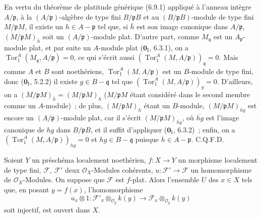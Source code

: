En vertu du théorème de platitude générique (6.9.1) appliqué à l'anneau
intègre $A/\mathfrak p$, à la $(A/\mathfrak p)$-algèbre de type fini
$B/\mathfrak pB$ et au $(B/\mathfrak pB)$-module de type fini
$M/\mathfrak pM$, il existe un $h\in A-\mathfrak p$ tel que, si $\bar h$ est
son image canonique dans $A/\mathfrak p$,
$(M/\mathfrak pM)_{\bar h}$ soit un $(A/\mathfrak p)$-module plat. D'autre
part, comme $M_{\mathfrak q}$ est un $A_{\mathfrak p}$-module plat, et par
suite un $A$-module plat ($\mathbf 0_{\mathrm I}$, 6.3.1), on a
$\operatorname{Tor}_1^A(M_{\mathfrak q},A/\mathfrak p)=0$, ce qui s'écrit
aussi
$(\operatorname{Tor}_1^A(M,A/\mathfrak p))_{\mathfrak q}=0$. Mais comme $A$
et $B$ sont noethériens, $\operatorname{Tor}_1^A(M,A/\mathfrak p)$ est un
$B$-module de type fini, donc ($\mathbf 0_{\mathrm I}$, 5.2.2) il existe
$g\in B-\mathfrak q$ tel que
$(\operatorname{Tor}_1^A(M,A/\mathfrak p))_g=0$. D'ailleurs, on a
$(M/\mathfrak pM)_{\bar h}=(M/\mathfrak pM)_h$ ($M/\mathfrak pM$ étant
considéré dans le second membre comme un $A$-module)~; de plus,
$(M/\mathfrak pM)_h$ étant un $B$-module,
$(M/\mathfrak pM)_{hg}$ est encore un $(A/\mathfrak p)$-module plat, car il
s'écrit $(M/\mathfrak pM)_{\overline{hg}}$, où $\overline{hg}$ est l'image
canonique de $hg$ dans $B/\mathfrak pB$, et il suffit d'appliquer
($\mathbf 0_{\mathrm I}$, 6.3.2)~; enfin, on a
$(\operatorname{Tor}_1^A(M,A/\mathfrak p))_{hg}=0$ et
$hg\in B-\mathfrak q$ puisque $h\in A-\mathfrak p$. C.Q.F.D.

\begin{corollary}[11.1.2]
\label{IV.11.1.2-fr}
Soient $Y$ un préschéma localement noethérien, $f:X\to Y$ un morphisme
localement de type fini, $\mathcal F$, $\mathcal F'$ deux
$\mathcal O_X$-Modules cohérents,
$u:\mathcal F'\to\mathcal F$ un homomorphisme de $\mathcal O_X$-Modules. On
suppose que $\mathcal F$ est $f$-plat. Alors l'ensemble $U$ des $x\in X$ tels
que, en posant $y=f(x)$, l'homomorphisme
\[
  u_x\otimes1:\mathcal F'_x\otimes_{\mathcal O_y}k(y)\longrightarrow
  \mathcal F_x\otimes_{\mathcal O_y}k(y)
\]
soit injectif, est ouvert dans $X$.
\end{corollary}

